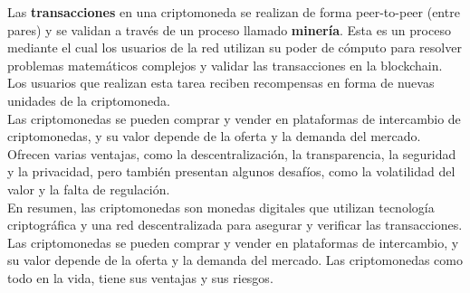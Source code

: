 \hfill \break
Las \textbf{transacciones} en una criptomoneda se realizan de forma peer-to-peer (entre 
pares) y se validan a través de un proceso llamado \textbf{minería}. Esta es 
un proceso mediante el cual los usuarios de la red utilizan su poder
de cómputo para resolver problemas matemáticos complejos y validar las 
transacciones en la blockchain. Los usuarios que realizan esta tarea reciben 
recompensas en forma de nuevas unidades de la criptomoneda.\\
\hfill \break
Las criptomonedas se pueden comprar y vender en plataformas de intercambio de 
criptomonedas, y su valor depende de la oferta y la demanda del mercado.\\ 
\hfill \break
Ofrecen varias ventajas, como la descentralización, la transparencia, la 
seguridad y la privacidad, pero también presentan algunos desafíos, como la 
volatilidad del valor y la falta de regulación.\\
\hfill \break
En resumen, las criptomonedas son monedas digitales que utilizan tecnología 
criptográfica y una red descentralizada para asegurar y verificar las 
transacciones. Las criptomonedas se pueden comprar y vender en plataformas de 
intercambio, y su valor depende de la oferta y la demanda del mercado. Las 
criptomonedas como todo en la vida, tiene sus ventajas y sus riesgos.\\